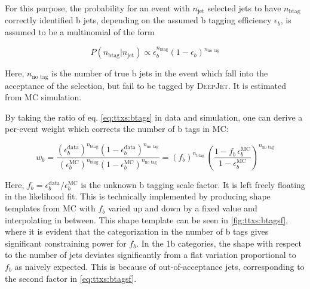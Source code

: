 For this purpose, the probability for an event with $n_{\mathrm{jet}}$ selected jets to have $n_{\mathrm{b tag}}$ correctly identified b jets, depending on the assumed b tagging efficiency $\epsilon_b$, is assumed to be a multinomial of the form

\begin{equation}
\label{eq:ttxs:btags}
    P (n_{\mathrm{b tag}} | n_{\mathrm{jet}}) \propto \epsilon_b^{n_{\mathrm{b tag}}} (1 - \epsilon_b)^{ n_{\text{no tag}}}
\end{equation}

Here, $n_{\text{no tag}}$ is the number of true b jets in the event which fall into the acceptance of the selection, but fail to be tagged by \textsc{DeepJet}. It is estimated from MC simulation. %

By taking the ratio of eq. \ref{eq:ttxs:btags} in data and simulation, one can derive a per-event weight which corrects the number of b tags in MC:

\begin{equation}
\label{eq:ttxs:btagsf}
    w_b = \frac
    {(\epsilon_b^{\mathrm{data}})^{n_{\mathrm{b tag}}} (1 - \epsilon_b^{\mathrm{data}})^{n_{\text{no tag}}}}
    {(\epsilon_b^{\mathrm{MC}})^{n_{\mathrm{b tag}}} (1 - \epsilon_b^{\mathrm{MC}})^{n_{\text{no tag}}}} 
    = (f_b)^{n_{\mathrm{b tag}}} \, \left( \frac{1 - f_b \, \epsilon_b^{\mathrm{MC}}}{1 - \epsilon_b^{\mathrm{MC}}} \right)^{n_{\text{no tag}}}
\end{equation}

Here, $f_b = \epsilon_b^{\mathrm{data}}/\epsilon_b^{\mathrm{MC}}$ is the unknown b tagging scale factor. It is left freely floating in the likelihood fit. This is technically implemented by producing shape templates from MC with $f_b$ varied up and down by a fixed value and interpolating in between. This shape template can be seen in \cref{fig:ttxs:btagsf}, where it is evident that the categorization in the number of b tags gives significant constraining power for $f_b$. In the 1b categories, the shape with respect to the number of jets deviates significantly from a flat variation proportional to $f_b$ as naively expected. This is because of out-of-acceptance jets, corresponding to the second factor in \cref{eq:ttxs:btagsf}.

